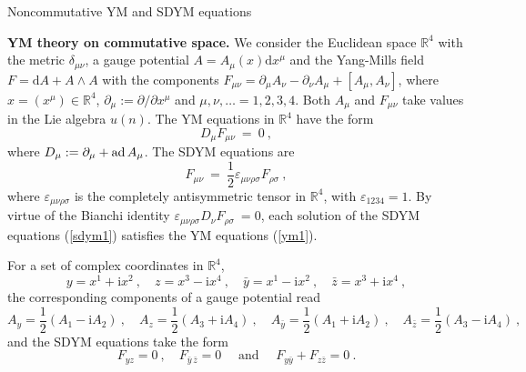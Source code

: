 \documentclass[a4paper,11pt]{article}
\makeatletter
\renewcommand{\section}{\@startsection{section}{1}{0pt}{\medskipamount}
{\medskipamount}{\large\bf}}
\numberwithin{equation}{section}
\def\de{\delta}
\def\ve{\varepsilon}
\def\s{\sigma}
\def\sfrac#1#2{{\textstyle\frac{#1}{#2}}}
\def\m{\mu}
\def\n{\nu}
\def\pa{\partial}
\newcommand{\im}{\mathrm{i}}
\newcommand{\diff}{\mathrm{d}}
\newcommand{\zb}{{\bar{z}}}
\newcommand{\yb}{{\bar{y}}}
\newcommand{\rc}{{\mathbb{R}^4}}
\makeatother
\begin{document}
\medskip

\section{Noncommutative YM and SDYM equations}


{\bf  YM theory on commutative space.}
We consider the Euclidean space $\rc$ with the metric $\de_{\m\n}$, 
a gauge potential $A=A_{\mu}(x)\diff x^\mu$ and the Yang-Mills 
field $F=\diff A+A\wedge A$ with the components
 $F_{\mu\nu}=\pa_{\mu}A_{\nu}-\pa_{\nu}A_{\mu}+[A_{\mu},A_{\nu}]$,
where $x=(x^\m)\in \rc$, $\pa_{\mu} :=\pa /\pa x^\mu$ and $\mu,\nu,
\ldots=1,2,3,4$. Both 
$A_{\mu}$ and $F_{\mu\nu}$ take values in the Lie algebra $u(n)$.
The YM equations in $\rc$ have the form
\begin{equation}\label{ym1}
D_\mu F_{\mu\nu}\ =\ 0\ ,
\end{equation}
where $D_\mu := \pa_\mu + {\rm ad}\, A_\mu$. 
The SDYM equations are~\cite{Belavin}
\begin{equation}\label{sdym1}
 F_{\mu\nu}\ =\ \sfrac{1}{2}\ve_{\mu\nu\rho\s}F_{\rho\s} \ ,
\end{equation}
where $\ve_{\mu\nu\rho\s}$ is the completely antisymmetric tensor in 
$\rc$, with $\ve_{1234}=1$. By virtue of the Bianchi identity 
$\ve_{\mu\nu\rho\s}D_\nu F_{\rho\s}  \ =0$,
 each solution of the SDYM equations (\ref{sdym1}) satisfies the YM equations  
(\ref{ym1}).  

{}For a set of complex coordinates in $\rc$,
\begin{equation}
y=x^1+\im x^2\ , \quad z=x^3-\im x^4\ , \quad \yb=x^1-\im x^2\ , \quad 
\zb=x^3+\im x^4\ ,
\label{ccrf}
\end{equation}
the corresponding components of a gauge potential read
\begin{equation}
A_y=\sfrac{1}{2}(A_1-\im A_2)\ , \quad A_z=\sfrac{1}{2}(A_3+\im A_4)\ , \quad
A_{\yb}=\sfrac{1}{2}(A_1+\im A_2)\ , \quad A_{\zb}=\sfrac{1}{2}(A_3 -\im A_4)\ , 
\end{equation}
and the SDYM equations take the form
\begin{equation}
F_{yz}=0\ , \quad F_{\yb \, \zb}=0 \quad\mbox{ and }\quad 
F_{y \yb}+F_{z \zb}=0 \ .
\label{cym}
\end{equation}

\medskip
\end{document}
